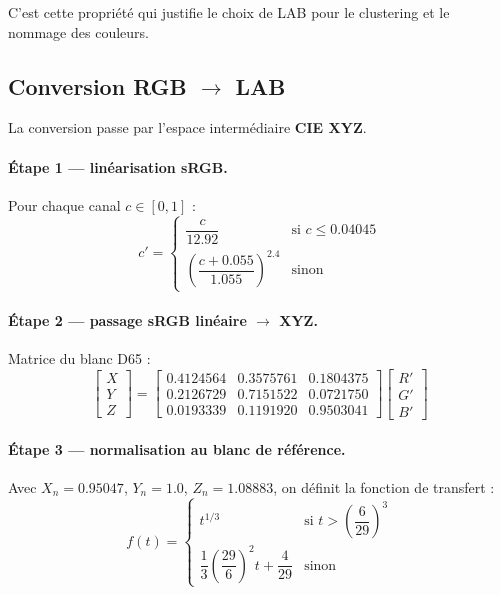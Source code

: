 \documentclass[11pt,a4paper]{article}
\begin{document}
C'est cette propriété qui justifie le choix de LAB pour le clustering et le
nommage des couleurs.

\subsection{Conversion RGB $\rightarrow$ LAB}

La conversion passe par l'espace intermédiaire \textbf{CIE XYZ}.

\paragraph{Étape 1 --- linéarisation sRGB.}
Pour chaque canal $c \in [0, 1]$ :
\begin{equation}
  c' = \begin{cases}
    \dfrac{c}{12.92} & \text{si } c \le 0.04045 \\[8pt]
    \left(\dfrac{c + 0.055}{1.055}\right)^{2.4} & \text{sinon}
  \end{cases}
  \label{eq:srgb}
\end{equation}

\paragraph{Étape 2 --- passage sRGB linéaire $\rightarrow$ XYZ.}
Matrice du blanc D65 :
\begin{equation}
  \begin{bmatrix} X \\ Y \\ Z \end{bmatrix}
  = \begin{bmatrix}
    0.4124564 & 0.3575761 & 0.1804375 \\
    0.2126729 & 0.7151522 & 0.0721750 \\
    0.0193339 & 0.1191920 & 0.9503041
  \end{bmatrix}
  \begin{bmatrix} R' \\ G' \\ B' \end{bmatrix}
  \label{eq:rgb2xyz}
\end{equation}

\paragraph{Étape 3 --- normalisation au blanc de référence.}
Avec $X_n = 0.95047$, $Y_n = 1.0$, $Z_n = 1.08883$, on définit la fonction
de transfert :
\begin{equation}
  f(t) = \begin{cases}
    t^{1/3} & \text{si } t > \left(\dfrac{6}{29}\right)^3 \\[8pt]
    \dfrac{1}{3}\left(\dfrac{29}{6}\right)^2 t + \dfrac{4}{29} & \text{sinon}
  \end{cases}
  \label{eq:ft}
\end{equation}
\end{document}
